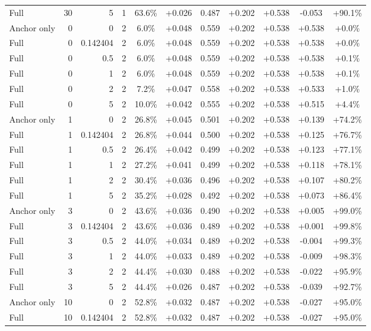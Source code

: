 \begin{table}[htbp]
\begin{tabular}{lrrrccccccc}
Full & 30 & 5 & 1 & 63.6\% & +0.026 & 0.487 & +0.202 & +0.538 & -0.053 & +90.1\% \\
Anchor only & 0 & 0 & 2 & 6.0\% & +0.048 & 0.559 & +0.202 & +0.538 & +0.538 & +0.0\% \\
Full & 0 & 0.142404 & 2 & 6.0\% & +0.048 & 0.559 & +0.202 & +0.538 & +0.538 & +0.0\% \\
Full & 0 & 0.5 & 2 & 6.0\% & +0.048 & 0.559 & +0.202 & +0.538 & +0.538 & +0.1\% \\
Full & 0 & 1 & 2 & 6.0\% & +0.048 & 0.559 & +0.202 & +0.538 & +0.538 & +0.1\% \\
Full & 0 & 2 & 2 & 7.2\% & +0.047 & 0.558 & +0.202 & +0.538 & +0.533 & +1.0\% \\
Full & 0 & 5 & 2 & 10.0\% & +0.042 & 0.555 & +0.202 & +0.538 & +0.515 & +4.4\% \\
Anchor only & 1 & 0 & 2 & 26.8\% & +0.045 & 0.501 & +0.202 & +0.538 & +0.139 & +74.2\% \\
Full & 1 & 0.142404 & 2 & 26.8\% & +0.044 & 0.500 & +0.202 & +0.538 & +0.125 & +76.7\% \\
Full & 1 & 0.5 & 2 & 26.4\% & +0.042 & 0.499 & +0.202 & +0.538 & +0.123 & +77.1\% \\
Full & 1 & 1 & 2 & 27.2\% & +0.041 & 0.499 & +0.202 & +0.538 & +0.118 & +78.1\% \\
Full & 1 & 2 & 2 & 30.4\% & +0.036 & 0.496 & +0.202 & +0.538 & +0.107 & +80.2\% \\
Full & 1 & 5 & 2 & 35.2\% & +0.028 & 0.492 & +0.202 & +0.538 & +0.073 & +86.4\% \\
Anchor only & 3 & 0 & 2 & 43.6\% & +0.036 & 0.490 & +0.202 & +0.538 & +0.005 & +99.0\% \\
Full & 3 & 0.142404 & 2 & 43.6\% & +0.036 & 0.489 & +0.202 & +0.538 & +0.001 & +99.8\% \\
Full & 3 & 0.5 & 2 & 44.0\% & +0.034 & 0.489 & +0.202 & +0.538 & -0.004 & +99.3\% \\
Full & 3 & 1 & 2 & 44.0\% & +0.033 & 0.489 & +0.202 & +0.538 & -0.009 & +98.3\% \\
Full & 3 & 2 & 2 & 44.4\% & +0.030 & 0.488 & +0.202 & +0.538 & -0.022 & +95.9\% \\
Full & 3 & 5 & 2 & 44.4\% & +0.026 & 0.487 & +0.202 & +0.538 & -0.039 & +92.7\% \\
Anchor only & 10 & 0 & 2 & 52.8\% & +0.032 & 0.487 & +0.202 & +0.538 & -0.027 & +95.0\% \\
Full & 10 & 0.142404 & 2 & 52.8\% & +0.032 & 0.487 & +0.202 & +0.538 & -0.027 & +95.0\% \\

\end{tabular}
\end{table}
